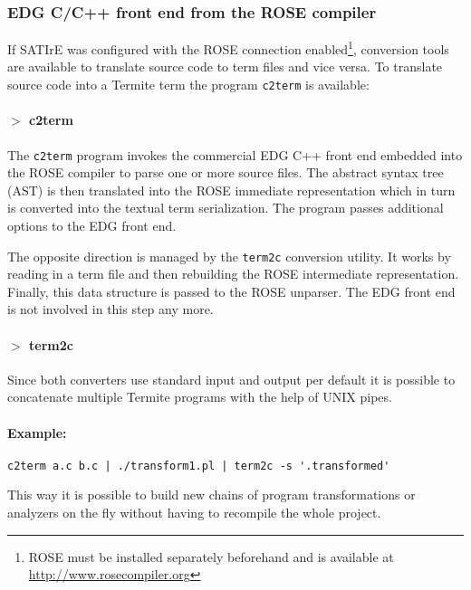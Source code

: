 \documentclass[10pt,twoside]{scrreprt}
\begin{document}
\subsubsection{EDG C/C++ front end from the ROSE compiler}
If SATIrE was configured with the ROSE connection
enabled\footnote{ROSE must be installed separately beforehand and is
  available at \url{http://www.rosecompiler.org}}, conversion tools
are available to translate source code to term files and vice versa.
To translate source code into a Termite term the program
\texttt{c2term} is available:

\paragraph{$>$ c2term}
The \texttt{c2term} program invokes the commercial EDG C++ front end
embedded into the ROSE compiler to parse one or more source files. The
abstract syntax tree (AST) is then translated into the ROSE immediate
representation which in turn is converted into the textual term
serialization. The program passes additional options to the EDG front
end.

The opposite direction is managed by the \texttt{term2c} conversion
utility. It works by reading in a term file and then rebuilding the
ROSE intermediate representation. Finally, this data structure is
passed to the ROSE unparser. The EDG front end is not involved in this
step any more.

\paragraph{$>$ term2c}

\bigskip

Since both converters use standard input and output per default it is
possible to concatenate multiple Termite programs with the help of
UNIX pipes.

\paragraph{Example:}
\begin{verbatim}
c2term a.c b.c | ./transform1.pl | term2c -s '.transformed'
\end{verbatim}
This way it is possible to build new chains of program transformations
or analyzers on the fly without having to recompile the whole project.
\end{document}

